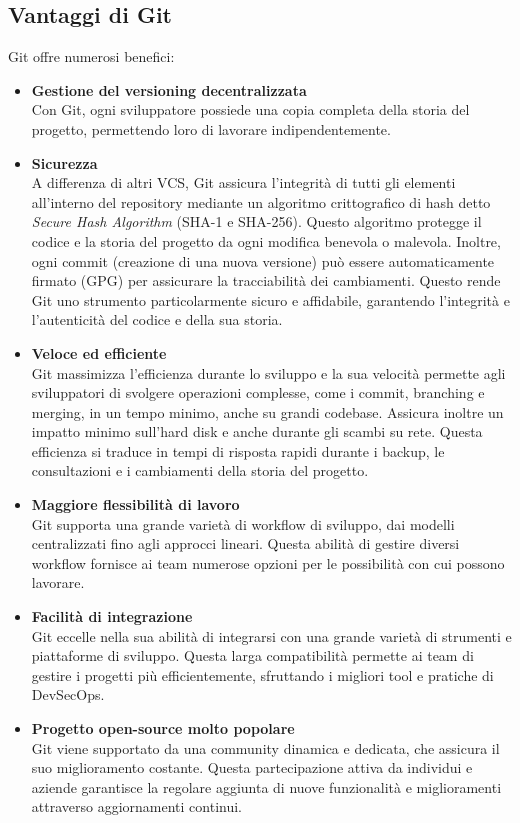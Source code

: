 \subsection{Vantaggi di Git}
Git offre numerosi benefici:
\begin{itemize}
    \item \textbf{Gestione del versioning decentralizzata}\\
    Con Git, ogni sviluppatore possiede una copia completa della storia del progetto, permettendo loro di lavorare indipendentemente.
    \item \textbf{Sicurezza}\\
    A differenza di altri VCS, Git assicura l'integrità di tutti gli elementi all'interno del repository mediante un algoritmo crittografico di hash detto \textit{Secure Hash Algorithm} (SHA-1 e SHA-256). Questo algoritmo protegge il codice e la storia del progetto da ogni modifica benevola o malevola. Inoltre, ogni commit (creazione di una nuova versione) può essere automaticamente firmato (GPG) per assicurare la tracciabilità dei cambiamenti. Questo rende Git uno strumento particolarmente sicuro e affidabile, garantendo l'integrità e l'autenticità del codice e della sua storia.
    \item \textbf{Veloce ed efficiente}\\
    Git massimizza l'efficienza durante lo sviluppo e la sua velocità permette agli sviluppatori di svolgere operazioni complesse, come i commit, branching e merging, in un tempo minimo, anche su grandi codebase. Assicura inoltre un impatto minimo sull'hard disk e anche durante gli scambi su rete. Questa efficienza si traduce in tempi di risposta rapidi durante i backup, le consultazioni e i cambiamenti della storia del progetto.
    \item \textbf{Maggiore flessibilità di lavoro}\\
    Git supporta una grande varietà di workflow di sviluppo, dai modelli centralizzati fino agli approcci lineari. Questa abilità di gestire diversi workflow fornisce ai team numerose opzioni per le possibilità con cui possono lavorare.
    \item \textbf{Facilità di integrazione}\\
    Git eccelle nella sua abilità di integrarsi con una grande varietà di strumenti e piattaforme di sviluppo. Questa larga compatibilità permette ai team di gestire i progetti più efficientemente, sfruttando i migliori tool e pratiche di DevSecOps.
    \item \textbf{Progetto open-source molto popolare}\\
    Git viene supportato da una community dinamica e dedicata, che assicura il suo miglioramento costante. Questa partecipazione attiva da individui e aziende garantisce la regolare aggiunta di nuove funzionalità e miglioramenti attraverso aggiornamenti continui.
\end{itemize}


